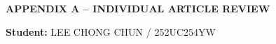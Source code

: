 \documentclass[12pt,a4paper]{article}
\begin{document}

\newpage

{}

\printbibliography[
    title={References}
]






\newpage

{}

\begin{flushleft}
    {\fontsize{14pt}{17pt}\selectfont
    \textbf{APPENDIX A -- INDIVIDUAL ARTICLE REVIEW}}
\end{flushleft}

\vspace{0.5cm}

\textbf{Student:} LEE CHONG CHUN / 252UC254YW
\end{document}
